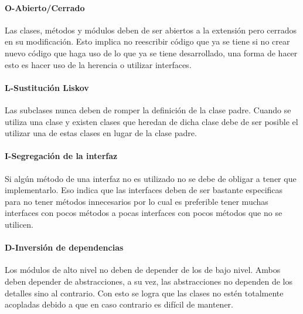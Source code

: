 \paragraph{O-Abierto/Cerrado} Las clases, métodos y módulos deben de ser abiertos a la extensión pero cerrados en su modificación. Esto implica no reescribir código que ya se tiene si no crear nuevo código que haga uso de lo que ya se tiene desarrollado, una forma de hacer esto es hacer uso de la herencia o utilizar interfaces.\cite{solidEjemplos}
\paragraph{L-Sustitución Liskov} Las subclases nunca deben de romper la definición de la clase padre. Cuando se utiliza una clase y existen clases que heredan de dicha clase debe de ser posible el utilizar una de estas clases en lugar de la clase padre.\cite{solidEjemplos}
\paragraph{I-Segregación de la interfaz} Si algún método de una interfaz no es utilizado no se debe de obligar a tener que implementarlo. Eso indica que las interfaces deben de ser bastante especificas para no tener métodos innecesarios por lo cual es preferible tener muchas interfaces con pocos métodos a pocas interfaces con pocos métodos que no se utilicen.\cite{solidEjemplos}
\paragraph{D-Inversión de dependencias} Los módulos de alto nivel no deben de depender de los de bajo nivel. Ambos deben depender de abstracciones, a su vez, las abstracciones no dependen de los detalles sino al contrario. Con esto se logra que las clases no estén totalmente acopladas debido a que en caso contrario es difícil de mantener. \cite{solidEjemplos}
